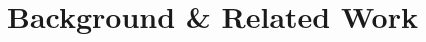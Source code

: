 \documentclass{article}
\begin{document}
\section{Background \& Related Work}\label{sec:related}











\end{document}
